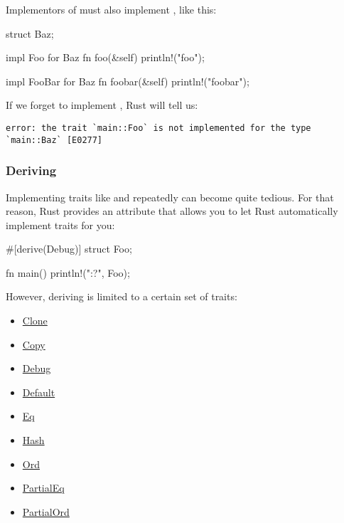 Implementors of  must also implement , like this:

\begin{rustc}
struct Baz;

impl Foo for Baz {
    fn foo(&self) { println!("foo"); }
}

impl FooBar for Baz {
    fn foobar(&self) { println!("foobar"); }
}
\end{rustc}

If we forget to implement , Rust will tell us:

\begin{verbatim}
error: the trait `main::Foo` is not implemented for the type `main::Baz` [E0277]
\end{verbatim}

\subsubsection*{Deriving}

Implementing traits like  and  repeatedly can become quite tedious. For that reason, Rust provides an attribute 
that allows you to let Rust automatically implement traits for you:

\begin{rustc}
#[derive(Debug)]
struct Foo;

fn main() {
    println!("{:?}", Foo);
}
\end{rustc}

However, deriving is limited to a certain set of traits:

\begin{itemize}
  \item{\href{https://doc.rust-lang.org/core/clone/trait.Clone.html}{Clone}}
  \item{\href{https://doc.rust-lang.org/core/marker/trait.Copy.html}{Copy}}
  \item{\href{https://doc.rust-lang.org/core/fmt/trait.Debug.html}{Debug}}
  \item{\href{https://doc.rust-lang.org/core/default/trait.Default.html}{Default}}
  \item{\href{https://doc.rust-lang.org/core/cmp/trait.Eq.html}{Eq}}
  \item{\href{https://doc.rust-lang.org/core/hash/trait.Hash.html}{Hash}}
  \item{\href{https://doc.rust-lang.org/core/cmp/trait.Ord.html}{Ord}}
  \item{\href{https://doc.rust-lang.org/core/cmp/trait.PartialEq.html}{PartialEq}}
  \item{\href{https://doc.rust-lang.org/core/cmp/trait.PartialOrd.html}{PartialOrd}}
\end{itemize}
